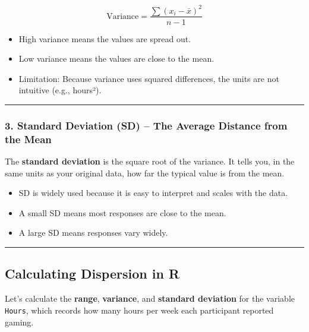 \documentclass[
]{book}
\providecommand{\tightlist}{%
  \setlength{\itemsep}{0pt}\setlength{\parskip}{0pt}}
\begin{document}
\[
\text{Variance} = \frac{\sum (x_i - \bar{x})^2}{n - 1}
\]

\begin{itemize}
\tightlist
\item
  High variance means the values are spread out.
\item
  Low variance means the values are close to the mean.
\item
  Limitation: Because variance uses squared differences, the units are not intuitive (e.g., hours²).
\end{itemize}

\begin{center}\rule{0.5\linewidth}{0.5pt}\end{center}

\subsubsection*{\texorpdfstring{3. \textbf{Standard Deviation (SD)} -- The Average Distance from the Mean}{3. Standard Deviation (SD) -- The Average Distance from the Mean}}\label{standard-deviation-sd-the-average-distance-from-the-mean}

The \textbf{standard deviation} is the square root of the variance. It tells you, in the same units as your original data, how far the typical value is from the mean.

\begin{itemize}
\tightlist
\item
  SD is widely used because it is easy to interpret and scales with the data.
\item
  A small SD means most responses are close to the mean.
\item
  A large SD means responses vary widely.
\end{itemize}

\begin{center}\rule{0.5\linewidth}{0.5pt}\end{center}

\subsection*{Calculating Dispersion in R}\label{calculating-dispersion-in-r}

Let's calculate the \textbf{range}, \textbf{variance}, and \textbf{standard deviation} for the variable \texttt{Hours}, which records how many hours per week each participant reported gaming.
\end{document}
